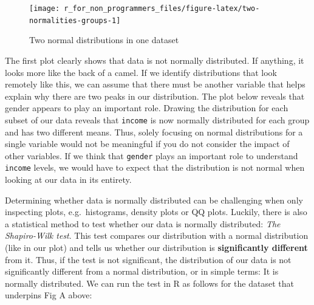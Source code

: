\documentclass[
]{book}
\newenvironment{Shaded}{\begin{snugshade}}{\end{snugshade}}
\newcommand{\DocumentationTok}[1]{\textcolor[rgb]{0.56,0.35,0.01}{\textbf{\textit{#1}}}}
\newcommand{\FunctionTok}[1]{\textcolor[rgb]{0.00,0.00,0.00}{#1}}
\newcommand{\NormalTok}[1]{#1}
\newcommand{\SpecialCharTok}[1]{\textcolor[rgb]{0.00,0.00,0.00}{#1}}
\begin{document}
\begin{figure}

{\centering \texttt{[image: r\_for\_non\_programmers\_files/figure-latex/two-normalities-groups-1]} 

}

\caption{Two normal distributions in one dataset}\label{fig:two-normalities-groups}
\end{figure}

The first plot clearly shows that data is not normally distributed. If anything, it looks more like the back of a camel. If we identify distributions that look remotely like this, we can assume that there must be another variable that helps explain why there are two peaks in our distribution. The plot below reveals that gender appears to play an important role. Drawing the distribution for each subset of our data reveals that \texttt{income} is now normally distributed for each group and has two different means. Thus, solely focusing on normal distributions for a single variable would not be meaningful if you do not consider the impact of other variables. If we think that \texttt{gender} plays an important role to understand \texttt{income} levels, we would have to expect that the distribution is not normal when looking at our data in its entirety.

Determining whether data is normally distributed can be challenging when only inspecting plots, e.g.~histograms, density plots or QQ plots. Luckily, there is also a statistical method to test whether our data is normally distributed: \emph{The Shapiro-Wilk test}. This test compares our distribution with a normal distribution (like in our plot) and tells us whether our distribution is \textbf{significantly different} from it. Thus, if the test is not significant, the distribution of our data is not significantly different from a normal distribution, or in simple terms: It is normally distributed. We can run the test in R as follows for the dataset that underpins Fig A above:

\begin{Shaded}
\end{Shaded}
\end{document}

